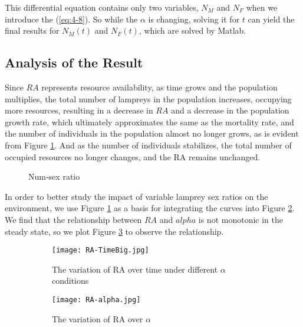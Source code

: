 \documentclass[12pt]{article}  %
\begin{document}
This differential equation contains only two variables, $N_M$ and $N_F$ when we introduce the (\ref{eq:4-8}). So while the $\alpha$ is changing, solving it for $t$ can yield the final results for $N_M(t)$ and $N_F(t)$, which are solved by Matlab.

\subsection{Analysis of the Result}
Since $RA$ represents resource availability, as time grows and the population multiplies, the total number of lampreys in the population increases, occupying more resources, resulting in a decrease in $RA$ and a decrease in the population growth rate, which ultimately approximates the same as the mortality rate, and the number of individuals in the population almost no longer grows, as is evident from Figure \ref{fig:3}. And as the number of individuals stabilizes, the total number of occupied resources no longer changes, and the RA remains unchanged.\cite{10}

\begin{figure}[htbp]
	\centering
	\quad    %
	\quad
	\quad
	\quad
	\quad
	\quad
	\caption{Num-sex ratio} \label{fig:3}
\end{figure}

In order to better study the impact of variable lamprey sex ratios on the environment, we use Figure \ref{fig:3} as a basis for integrating the curves into Figure \ref{subfig:left}. We find that the relationship between $RA$ and $alpha$ is not monotonic in the steady state, so we plot Figure \ref{subfig:right} to observe the relationship.

\begin{figure}[htbp]
	\centering
	\begin{subfigure}[b]{.45\textwidth}
		\texttt{[image: RA-TimeBig.jpg]}
		\caption{\centering The variation of RA over time under different $\alpha$ conditions}\label{subfig:left}
	\end{subfigure}
	\begin{subfigure}[b]{.5\textwidth}
		\texttt{[image: RA-alpha.jpg]}
		\caption{\centering The variation of RA over $\alpha$}\label{subfig:right}
	\end{subfigure}
	\caption{}\label{fig:subfigures}
\end{figure}
\end{document}

